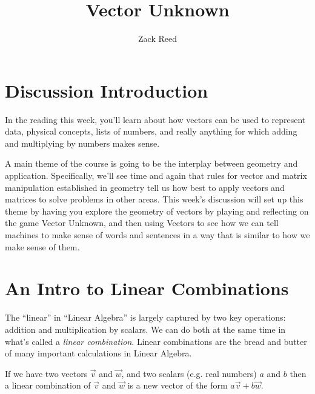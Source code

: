 \documentclass{ximera}
\author{Zack Reed}
\title{Vector Unknown}
\begin{document}
\begin{abstract}

\end{abstract}
\maketitle


\section{Discussion Introduction}

  In the reading this week, you'll learn about how vectors can be used to represent data, physical concepts, lists of numbers, and really anything for which adding and multiplying by numbers makes sense. 
  
  A main theme of the course is going to be the interplay between geometry and application. Specifically, we'll see time and again that rules for vector and matrix manipulation established in geometry tell us how best to apply vectors and matrices to solve problems in other areas. This week's discussion will set up this theme by having you explore the geometry of vectors by playing and reflecting on the game Vector Unknown, and then using Vectors to see how we can tell machines to make sense of words and sentences in a way that is similar to how we make sense of them.

\section{An Intro to Linear Combinations}

  The ``linear'' in  ``Linear Algebra'' is largely captured by two key operations: addition and multiplication by scalars. We can do both at the same time in what's called a \emph{linear combination}. Linear combinations are the bread and butter of many important calculations in Linear Algebra. 

  If we have two vectors $\vec{v}$ and $\vec{w}$, and two scalars (e.g. real numbers) $a$ and $b$ then a linear combination of $\vec{v}$ and $\vec{w}$ is a new vector of the form $a\vec{v} + b\vec{w}$.
\end{document}
